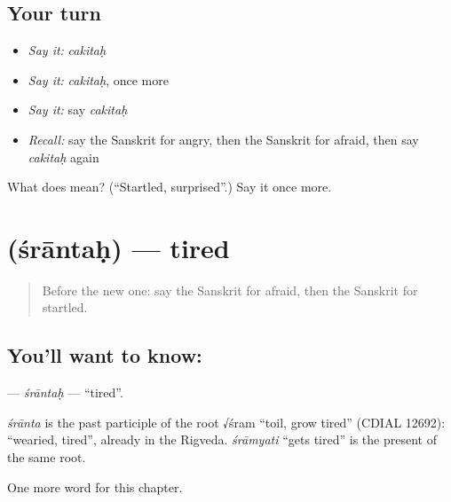 \subsection*{Your turn}
\begin{itemize}
\raggedright
  \item \emph{Say it:} \emph{cakitaḥ}
  \item \emph{Say it:} \emph{cakitaḥ}, once more
  \item \emph{Say it:} say \emph{cakitaḥ}
  \item \emph{Recall:} say the Sanskrit for angry, then the Sanskrit for afraid, then say \emph{cakitaḥ} again
\end{itemize}

\begin{tcolorbox}[breakable,colback=teal!4,colframe=teal!35!black,title={Before you move on}]
What does  mean? (\textquotedblleft{}Startled, surprised\textquotedblright{}.) Say it once more.
\end{tcolorbox}
\section[\texorpdfstring{\sk{श्रान्तः} (śrāntaḥ)}{श्रान्तः (śrāntaḥ)}]{ (śrāntaḥ) — tired}

\label{lesson:SA-C157-srantah}



\begin{quote}
Before the new one: say the Sanskrit for afraid, then the Sanskrit for startled.
\end{quote}

\subsection*{You'll want to know: }
\textbf{} — \emph{śrāntaḥ} — \textquotedblleft{}tired\textquotedblright{}.

\begin{cousinweb}
\emph{śrānta} is the past participle of the root √śram \textquotedblleft{}toil, grow tired\textquotedblright{} (CDIAL 12692): \textquotedblleft{}wearied, tired\textquotedblright{}, already in the Rigveda. \emph{śrāmyati} \textquotedblleft{}gets tired\textquotedblright{} is the present of the same root.
\end{cousinweb}

\begin{grammarlens}[title={What you've built}]
One more word for this chapter.
\end{grammarlens}

